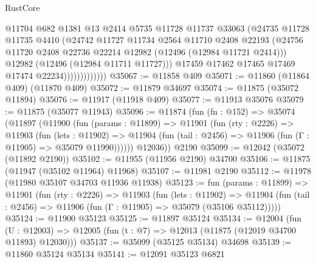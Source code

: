 \begin{lexlean}{RustCore}
\begin{coremodule}
                            @11704
                            @682
                            @1381
                            @13
                            @2414
                            @5735
                            @11728
                            @11737
                            @33063
                            (@24735
                              @11728
                              @11735
                              @4410
                              (@24742
                                @11727
                                @11734
                                @2564
                                @11710
                                @2408
                                @22193
                                (@24756
                                  @11720
                                  @2408
                                  @22736
                                  @22214
                                  @12982
                                  (@12496 (@12984 @11721 @2414)))
                                @12982
                                (@12496 (@12984 @11711 @11727)))
                              @17459
                              @17462
                              @17465
                              @17469
                              @17474
                              @22234)))))))))))))
@35067 := @11858 @409
@35071 := @11860 (@11864 @409) (@11870 @409)
@35072 := @11879 @34697
@35074 := @11875 (@35072 @11894)
@35076 := @11917 (@11918 @409)
@35077 := @11913 @35076
@35079 := @11875 (@35077 @11943)
@35096 := @11874
    (fun (fn : @152) =>
    @35074
      (@11897
        (@11900
          (fun (params : @11899) =>
          @11901
            (fun (rty : @2226) =>
            @11903
              (fun (lets : @11902) =>
              @11904 (fun (tail : @2456) => @11906 (fun (Γ : @11905) => @35079 @11990))))))
        @12036))
    @2190
@35099 := @12042 (@35072 (@11892 @2190))
@35102 := @11955 (@11956 @2190) @34700
@35106 := @11875 (@11947 (@35102 @11964) @11968)
@35107 := @11981 @2190
@35112 := @11978 (@11980 @35107 @34703 @11936 @11938)
@35123 := fun (params : @11899) =>
  @11901
    (fun (rty : @2226) =>
    @11903
      (fun (lets : @11902) =>
      @11904 (fun (tail : @2456) => @11906 (fun (Γ : @11905) => @35079 (@35106 @35112)))))
@35124 := @11900 @35123
@35125 := @11897 @35124
@35134 := @12004
    (fun (U : @12003) => @12005 (fun (t : @7) => @12013 (@11875 (@12019 @34700 @11893) @12030)))
@35137 := @35099 (@35125 @35134) @34698
@35139 := @11860 @35124 @35134
@35141 := @12091 @35123 @6821

\end{coremodule}
\end{lexlean}
